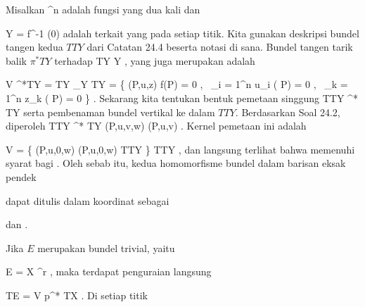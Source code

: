 {}
{

Misalkan
 {\R^n } { \R
} {}
adalah fungsi yang dua kali
dan

\mavergleichskette
{\vergleichskette
{ Y
}
{ = }{ f^{-1} (0)
}
{  }{
}
{    }{
}
{   }{
}
}
{}{}{}
adalah
terkait yang
pada setiap titik. Kita gunakan deskripsi bundel tangen kedua $TTY$ dari
Catatan 24.4
beserta notasi di sana. Bundel tangen tarik balik $\pi^*TY$ terhadap
\maabbdisp {\pi} {TY} {Y
} {,}
yang juga merupakan
adalah

\mavergleichskettealign
{\vergleichskettealign
{ V
}
{ \cong} { \pi^*TY
}
{ =} { TY \times_Y TY
}
{ =} { \left\{ (P,u,z)  \mid  f(P) = 0 , \,  \sum_{i = 1}^n u_i {  } ( P) = 0   , \,  \sum_{k = 1}^n z_k {  } ( P) = 0    \right\}
}
{ } {
}
}
{}
{}{.}
Sekarang kita tentukan bentuk pemetaan singgung
 {TTY } { \pi^* TY
} {}
serta pembenaman bundel vertikal ke dalam $TTY$. Berdasarkan
Soal 24.2,
diperoleh
 {TTY} { \pi^* TY
} {(P,u,v,w)} { (P,u,v)
} {.}
Kernel pemetaan ini adalah

\mavergleichskettedisp
{\vergleichskette
{ V
}
{ =} { \left\{  (P,u,0,w)   \mid   (P,u,0,w) \in TTY          \right\}
}
{ \subset} { TTY
}
{ } {
}
{ } {
}
}
{}{}{,}
dan langsung terlihat bahwa
 memenuhi syarat bagi
.
Oleh sebab itu, kedua homomorfisme bundel dalam barisan eksak pendek

 {  }

dapat ditulis dalam koordinat sebagai

 dan
.

}

Jika $E$ merupakan bundel trivial, yaitu

\mavergleichskette
{\vergleichskette
{ E
}
{ = }{ X \times \R^r
}
{  }{
}
{    }{
}
{   }{
}
}
{}{}{,}
maka terdapat penguraian langsung
 {} {}

\mavergleichskette
{\vergleichskette
{ TE
}
{ = }{ V \oplus p^* TX
}
{  }{
}
{    }{
}
{   }{
}
}
{}{}{.}
Di setiap titik

